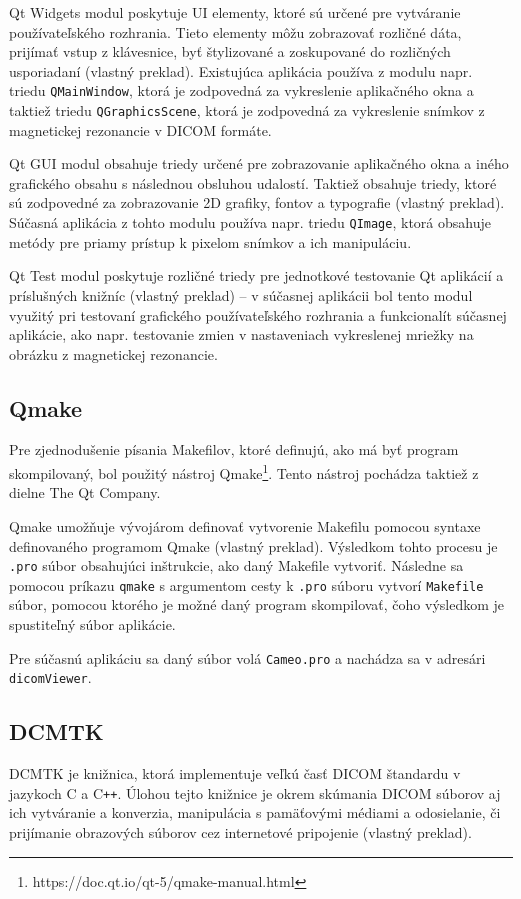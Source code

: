 Qt Widgets modul poskytuje UI elementy, ktoré sú určené pre vytváranie používateľského rozhrania. Tieto elementy môžu zobrazovať rozličné dáta, prijímať vstup z klávesnice, byť štylizované a zoskupované do rozličných usporiadaní \cite{qtwidgets_description} (vlastný preklad). Existujúca aplikácia používa z modulu napr. triedu \texttt{QMainWindow}, ktorá je zodpovedná za vykreslenie aplikačného okna a taktiež triedu \texttt{QGraphicsScene}, ktorá je zodpovedná za vykreslenie snímkov z magnetickej rezonancie v DICOM formáte.

\clearpage

Qt GUI modul obsahuje triedy určené pre zobrazovanie aplikačného okna a iného grafického obsahu s následnou obsluhou udalostí. Taktiež obsahuje triedy, ktoré sú zodpovedné za zobrazovanie 2D grafiky, fontov a typografie \cite{qtgui_description} (vlastný preklad).
Súčasná aplikácia z tohto modulu používa napr. triedu \texttt{QImage}, ktorá obsahuje metódy pre priamy prístup k pixelom snímkov a ich manipuláciu.

Qt Test modul poskytuje rozličné triedy pre jednotkové testovanie Qt aplikácií a príslušných knižníc \cite{qttest_description} (vlastný preklad) -- v súčasnej aplikácii bol tento modul využitý pri testovaní grafického používateľského rozhrania a funkcionalít súčasnej aplikácie, ako napr. testovanie zmien v nastaveniach vykreslenej mriežky na obrázku z magnetickej rezonancie.

\subsection {Qmake}\label{qmake}
Pre zjednodušenie písania Makefilov, ktoré definujú, ako má byť program skompilovaný, bol použitý nástroj Qmake\footnote{https://doc.qt.io/qt-5/qmake-manual.html}. Tento nástroj pochádza taktiež z dielne The Qt Company.

Qmake umožňuje vývojárom definovať vytvorenie Makefilu pomocou syntaxe definovaného programom Qmake \cite{qmake_description} (vlastný preklad). Výsledkom tohto procesu je \texttt{.pro} súbor obsahujúci inštrukcie, ako daný Makefile vytvoriť. Následne sa pomocou príkazu \texttt{qmake} s argumentom cesty k \texttt{.pro} súboru vytvorí \texttt{Makefile} súbor, pomocou ktorého je možné daný program skompilovať, čoho výsledkom je spustiteľný súbor aplikácie.

Pre súčasnú aplikáciu sa daný súbor volá \texttt{Cameo.pro} a nachádza sa v adresári \texttt{dicomViewer}.

\subsection {DCMTK}\label{dcmtk}
DCMTK je knižnica, ktorá implementuje veľkú časť DICOM štandardu v jazykoch C a C\texttt{++}. Úlohou tejto knižnice je okrem skúmania DICOM súborov aj ich vytváranie a konverzia, manipulácia s pamäťovými médiami a odosielanie, či prijímanie obrazových súborov cez internetové pripojenie \cite{dcmtk_description} (vlastný preklad).

